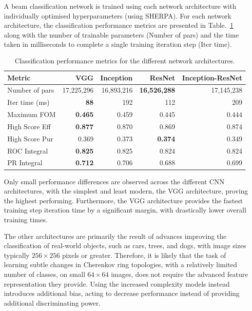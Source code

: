 A beam classification network is trained using each network architecture with individually
optimised hyperparameters (using SHERPA). For each network architecture, the classification
performance metrics are presented in Table.~\ref{tab:sample} along with the number of trainable
parameters (Number of pars) and the time taken in milliseconds to complete a single training
iteration step (Iter time).

\begin{table} %
    \begin{tabular}{lrrrr}
        Metric         & VGG            & Inception  & ResNet              & Inception-ResNet \\
        \midrule
        Number of pars & 17,225,296     & 16,893,216 & \textbf{16,526,288} & 17,145,238       \\
        Iter time (ms) & \textbf{88}    & 192        & 112                 & 209              \\
        Maximum FOM    & \textbf{0.465} & 0.459      & 0.445               & 0.444            \\
        High Score Eff & \textbf{0.877} & 0.870      & 0.869               & 0.874            \\
        High Score Pur & 0.369          & 0.373      & \textbf{0.374}      & 0.349            \\
        ROC Integral   & \textbf{0.825} & 0.825      & 0.824               & 0.824            \\
        PR Integral    & \textbf{0.712} & 0.706      & 0.688               & 0.699            \\
    \end{tabular}
    \caption[Classification performance metrics for different network architectures]
    {Classification performance metrics for the different network architectures.}
    \label{tab:sample}
\end{table}

Only small performance differences are observed across the different CNN architectures, with the
simplest and least modern, the VGG architecture, proving the highest performing. Furthermore, the
VGG architecture provides the fastest training step iteration time by a significant margin, with
drastically lower overall training times.

The other architectures are primarily the result of advances improving the classification of
real-world objects, such as cars, trees, and dogs, with image sizes typically $256\times256$
pixels or greater. Therefore, it is likely that the task of learning subtle changes in Cherenkov
ring topologies, with a relatively limited number of classes, on small $64\times64$ images, does
not require the advanced feature representation they provide. Using the increased complexity
models instead introduces additional bias, acting to decrease performance instead of providing
additional discriminating power.